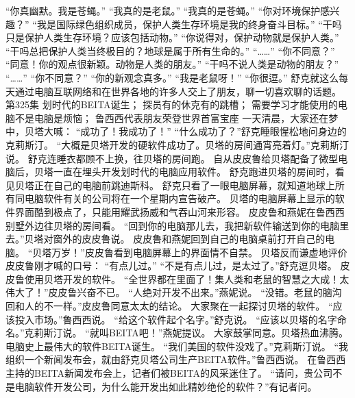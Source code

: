 \documentclass[a4paper,12pt,UTF8,twoside]{ctexbook}
\begin{document}
        “你真幽默。我是苍蝇。”  
        “我真的是老鼠。”  
        “我真的是苍蝇。”  
        “你对环境保护感兴趣？”  
        “我是国际绿色组织成员，保护人类生存环境是我的终身奋斗目标。”  
        “干吗只是保护人类生存环境？应该包括动物。”  
        “你说得对，保护动物就是保护人类。”  
        “干吗总把保护人类当终极目的？地球是属于所有生命的。”  
        “……”        
        “你不同意？”  
        “同意！你的观点很新颖。动物是人类的朋友。”  
        “干吗不说人类是动物的朋友？”  
        “……”  
        “你不同意？”  
        “你的新观念真多。”  
        “我是老鼠呀！”  
        “你很逗。”  
        舒克就这么每天通过电脑互联网络和在世界各地的许多人交上了朋友，聊一切喜欢聊的话题。          第325集  
        划时代的BEITA诞生；  
        探员有的休克有的跳槽；  
        需要学习才能使用的电脑不是电脑是烦恼；  
        鲁西西代表朋友荣登世界首富宝座    
        一天清晨，大家还在梦中，贝塔大喊：  
        “成功了！我成功了！”  
        “什么成功了？”舒克睡眼惺松地问身边的克莉斯汀。  
        “大概是贝塔开发的硬软件成功了。贝塔的房间通宵亮着灯。”克莉斯汀说。  
        舒克连睡衣都顾不上换，往贝塔的房间跑。  
        自从皮皮鲁给贝塔配备了微型电脑后，贝塔一直在埋头开发划时代的电脑应用软件。  
        舒克跑进贝塔的房间时，看见贝塔正在自己的电脑前跳迪斯科。  
        舒克只看了一眼电脑屏幕，就知道地球上所有同电脑软件有关的公司将在一个星期内宣告破产。  
        贝塔的电脑屏幕上显示的软件界面酷到极点了，只能用耀武扬威和气吞山河来形容。  
        皮皮鲁和燕妮在鲁西西别墅外边往贝塔的房间看。  
        “回到你的电脑那儿去，我把新软件输送到你的电脑里去。”贝塔对窗外的皮皮鲁说。  
        皮皮鲁和燕妮回到自己的电脑桌前打开自己的电脑。  
        “贝塔万岁！”皮皮鲁看到电脑屏幕上的界面情不自禁。  
        贝塔反而谦虚地评价皮皮鲁刚才喊的口号：  
        “有点儿过。”  
        “不是有点儿过，是太过了。”舒克逗贝塔。  
        皮皮鲁使用贝塔开发的软件。  
        “全世界都在里面了！集人类和老鼠的智慧之大成！太伟大了！”皮皮鲁兴奋不已。  
        “人绝对开发不出来。”燕妮说。  
        “没错。老鼠的脑沟回和人的不一样。”皮皮鲁同意太太的结论。  
        大家聚在一起探讨贝塔的软件。  
        “应该投入市场。”鲁西西说。  
        “给这个软件起个名字。”舒克说。        
        “应该以贝塔的名字命名。”克莉斯汀说。  
        “就叫BEITA吧！”燕妮提议。  
        大家鼓掌同意。贝塔热血沸腾。  
        电脑史上最伟大的软件BEITA诞生。  
        “我们美国的软件没戏了。”克莉斯汀说。  
        “我组织一个新闻发布会，就由舒克贝塔公司生产BEITA软件。”鲁西西说。  
        在鲁西西主持的BEITA新闻发布会上，记者们被BEITA的风采迷住了。  
        “请问，贵公司不是电脑软件开发公司，为什么能开发出如此精妙绝伦的软件？”有记者问。  
\end{document}
